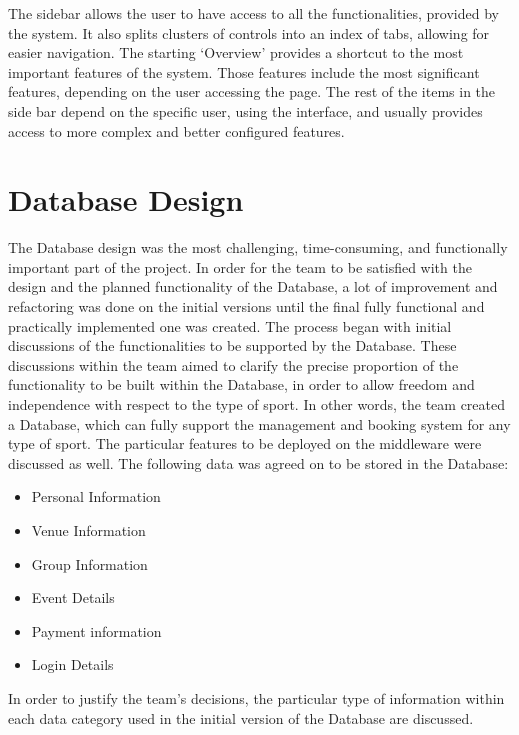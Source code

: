 \documentclass{l3proj}
\begin{document}
\par The sidebar allows the user to have access to all the functionalities, provided by the system. It also splits clusters of controls into an index of tabs, allowing for easier navigation. The starting `Overview' provides a shortcut to the most important features of the system. Those features include the most significant features, depending on the user accessing the page. The rest of the items in the side bar depend on the specific user, using the interface, and usually provides access to more complex and better configured features.

\section{Database Design}
\par
The Database design was the most challenging, time-consuming, and functionally important part of the project. In order for the team to be satisfied with the design and the planned functionality of the Database, a lot of improvement and refactoring was done on the initial versions until the final fully functional and practically implemented one was created. The process began with initial discussions of the functionalities to be supported by the Database. These discussions within the team aimed to clarify the precise proportion of the functionality to be built within the Database, in order to allow freedom and independence with respect to the type of sport. In other words, the team created a Database, which can fully support the management and booking system for any type of sport. The particular features to be deployed on the middleware were discussed as well. The following data was agreed on to be stored in the Database:
\begin{itemize}
	\item Personal Information
	\item Venue Information
	\item Group Information
	\item Event Details
	\item Payment information
	\item Login Details
\end{itemize}
\par In order to justify the team's decisions, the particular type of information within each data category used in the initial version of the Database are discussed.\\
\end{document}
